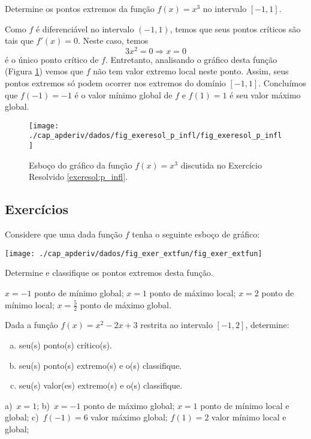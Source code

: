 \begin{exeresol}\label{exeresol:p_infl}
  Determine os pontos extremos da função $f(x)=x^3$ no intervalo $[-1, 1]$.
\end{exeresol}
\begin{resol}
  Como $f$ é diferenciável no intervalo $(-1, 1)$, temos que seus pontos críticos são tais que $f'(x)=0$. Neste caso, temos
  \begin{equation}
    3x^2=0\Rightarrow x=0
  \end{equation}
  é o único ponto crítico de $f$. Entretanto, analisando o gráfico desta função (Figura \ref{fig:exeresol_p_infl}) vemos que $f$ não tem valor extremo local neste ponto. Assim, seus pontos extremos só podem ocorrer nos extremos do domínio $[-1, 1]$. Concluímos que $f(-1)=-1$ é o valor mínimo global de $f$ e $f(1)=1$ é seu valor máximo global.

  \begin{figure}[H]
    \centering
    \texttt{[image: ./cap\_apderiv/dados/fig\_exeresol\_p\_infl/fig\_exeresol\_p\_infl]}
    \caption{Esboço do gráfico da função $f(x) = x^3$ discutida no Exercício Resolvido \ref{exeresol:p_infl}.}
    \label{fig:exeresol_p_infl}
  \end{figure}
\end{resol}

\subsection{Exercícios}

\begin{exer}
  Considere que uma dada função $f$ tenha o seguinte esboço de gráfico:

  \begin{center}
    \texttt{[image: ./cap\_apderiv/dados/fig\_exer\_extfun/fig\_exer\_extfun]}
  \end{center}

  Determine e classifique os pontos extremos desta função.
\end{exer}
\begin{resp}
  $x=-1$ ponto de mínimo global; $x=1$ ponto de máximo local; $x=2$ ponto de mínimo local; $x=\frac{5}{2}$ ponto de máximo global.
\end{resp}

\begin{exer}
  Dada a função $f(x)=x^2-2x+3$ restrita ao intervalo $[-1,2]$, determine:
  \begin{enumerate}[a)]
  \item seu(s) ponto(s) crítico(s).
  \item seu(s) ponto(s) extremo(s) e o(s) classifique.
  \item seu(s) valor(es) extremo(s) e o(s) classifique.
  \end{enumerate}
\end{exer}
\begin{resp}
  a)~$x=1$; b)~$x=-1$ ponto de máximo global; $x=1$ ponto de mínimo local e global; c)~$f(-1)=6$ valor máximo global; $f(1)=2$ valor mínimo local e global;
\end{resp}

